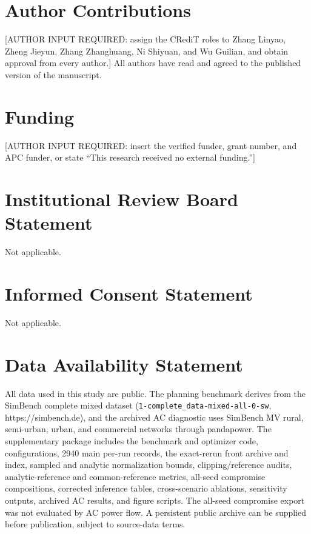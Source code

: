 \documentclass[energies,article,submit,moreauthors]{Definitions/mdpi}
\begin{document}
\section*{Author Contributions}

{[}AUTHOR INPUT REQUIRED: assign the CRediT roles to Zhang Linyao, Zheng Jieyun, Zhang Zhanghuang, Ni Shiyuan, and Wu Guilian, and obtain approval from every author.{]} All authors have read and agreed to the published version of the manuscript.

\section*{Funding}

{[}AUTHOR INPUT REQUIRED: insert the verified funder, grant number, and APC funder, or state ``This research received no external funding.''{]}

\section*{Institutional Review Board Statement}

Not applicable.

\section*{Informed Consent Statement}

Not applicable.

\section*{Data Availability Statement}

All data used in this study are public. The planning benchmark derives from the SimBench complete mixed dataset (\texttt{1-complete\_data-mixed-all-0-sw}, https://simbench.de), and the archived AC diagnostic uses SimBench MV rural, semi-urban, urban, and commercial networks through pandapower. The supplementary package includes the benchmark and optimizer code, configurations, 2940 main per-run records, the exact-rerun front archive and index, sampled and analytic normalization bounds, clipping/reference audits, analytic-reference and common-reference metrics, all-seed compromise compositions, corrected inference tables, cross-scenario ablations, sensitivity outputs, archived AC results, and figure scripts. The all-seed compromise export was not evaluated by AC power flow. A persistent public archive can be supplied before publication, subject to source-data terms.
\end{document}
